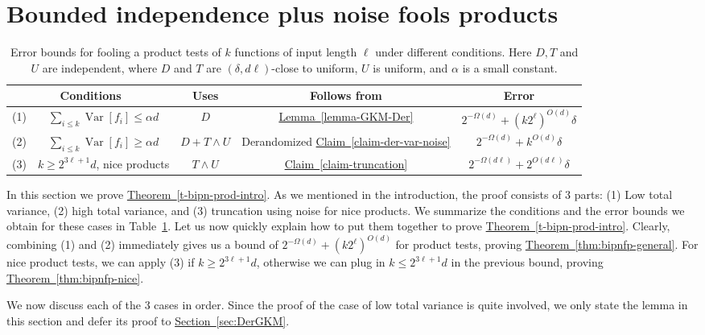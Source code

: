 \documentclass[11pt]{article}
\numberwithin{equation}{section}
\theoremstyle{definition}
\theoremstyle{plain}
\newcommand{\expref}[2]{\hyperref[#2]{#1~\ref{#2}}}
\def\Blocklength{\ell}
\DeclareMathOperator*{\Var}{Var}                 %
\begin{document}
\section{Bounded independence plus noise fools products} \label{sec:bipnfp}
  \begin{table}
    \begin{center}
      \begin{tabular}{|c c|c|c|c|}
        \hline
        \multicolumn{2}{|c|}{Conditions} & Uses & Follows from & Error \\
        \hline
        \hline
  			(1) & $\sum_{i \le k} \Var[f_i] \le \alpha d$ & $D$ & \expref{Lemma}{lemma-GKM-Der} & $2^{-\Omega(d)} + (k2^\Blocklength)^{O(d)} \delta$ \\
        \hline
  			(2) & $\sum_{i \le k} \Var[f_i] \ge \alpha d$ & $D + T \wedge U$ & Derandomized \expref{Claim}{claim-der-var-noise} & $2^{-\Omega(d)} + k^{O(d)} \delta$ \\
        \hline
        (3) & $k \ge 2^{3\Blocklength+1} d$, nice products & $T \wedge U$ & \expref{Claim}{claim-truncation} & $2^{-\Omega(d\Blocklength)} + 2^{O(d\Blocklength)} \delta$ \\
        \hline
      \end{tabular}
      \caption{Error bounds for fooling a product tests of $k$ functions of input length $\Blocklength$ under different conditions.
      Here 
      $D,T$ and $U$ are independent, where %
      $D$ and $T$ are $(\delta,d\Blocklength)$-close to uniform,
      $U$ is uniform, %
      and $\alpha$ is a small constant.} \label{table:bipnfp}
    \end{center}
  \end{table}
  In this section we prove \expref{Theorem}{t-bipn-prod-intro}.
  As we mentioned in the introduction, the proof consists of 3 parts: (1) Low total variance, (2) high total variance, and (3) truncation using noise for nice products.
  We summarize the conditions and the error bounds we obtain for these cases in Table~\ref{table:bipnfp}.  
  Let us now quickly explain how to put them together to prove \expref{Theorem}{t-bipn-prod-intro}.
  Clearly, combining (1) and (2) immediately gives us a bound of $2^{-\Omega(d)} + (k2^\Blocklength)^{O(d)}$ for product tests, proving \expref{Theorem}{thm:bipnfp-general}.
  For nice product tests, we can apply (3) if $k \ge 2^{3\Blocklength+1}d $, otherwise we can plug in $k \le 2^{3\Blocklength+1}d$ in the previous bound, proving \expref{Theorem}{thm:bipnfp-nice}.

  We now discuss each of the 3 cases in order.
  Since the proof of the case of low total variance is quite involved, we only state the lemma in this section and defer its proof to \expref{Section}{sec:DerGKM}.
\end{document}
